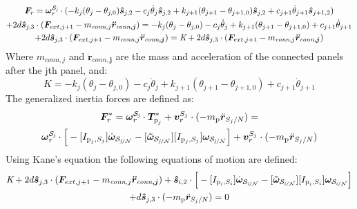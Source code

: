 \documentclass[paper]{aiaaNew}
\begin{document}
\begin{multline}
\bm F_{r} = \bm \omega_{\textit{r}}^{\cal{S}_\textit{j}} \cdot (-k_j (\theta_j-\theta_{j,0}) \bm{\hat{s}}_{j,2} - c_j \dot{\theta}_j \bm{\hat{s}}_{j,2}  +k_{j+1} (\theta_{j+1}-\theta_{j+1,0}) \bm{\hat{s}}_{j,2} +c_{j+1} \dot{\theta}_{j+1} \bm{\hat{s}}_{j+1,2})\\
+ 2d\bm{\hat{s}}_{j,3}\cdot(\bm F_{ext,j+1} - m_{\textit{conn},j}\bm{\ddot{r}_{\textit{conn},j}}) = 
-k_j (\theta_j-\theta_{j,0}) - c_j \dot{\theta}_j + k_{j+1} (\theta_{j+1}-\theta_{j+1,0}) + c_{j+1} \dot{\theta}_{j+1}\\
+ 2d\bm{\hat{s}}_{j,3}\cdot(\bm F_{ext,j+1} - m_{\textit{conn},j}\bm{\ddot{r}_{\textit{conn},j}}) = \textit{K} + 2d\bm{\hat{s}}_{j,3}\cdot(\bm F_{ext,j+1} - m_{\textit{conn},j}\bm{\ddot{r}_{\textit{conn},j}}) 
\end{multline}
Where $m_{\textit{conn},j}$ and $\bm{\ddot{r}_{\textit{conn},j}}$ are the mass and acceleration of the connected panels after the jth panel, and:
\begin{equation}
K= -k_j (\theta_j-\theta_{j,0}) - c_j \dot{\theta}_j + k_{j+1} (\theta_{j+1}-\theta_{j+1,0}) + c_{j+1} \dot{\theta}_{j+1}
\end{equation}
The generalized inertia forces are defined as:
\begin{multline}
\bm F^*_{r} = \bm \omega_{\textit{r}}^{\cal{S}_\textit{j}} \cdot \bm T^*_{\text{p}_j}  +\bm v^{S_j}_{r} \cdot (-m_{\text{p}} \ddot{\bm r}_{S_{j}/N}) = \\ %
\bm \omega_{\textit{r}}^{\cal{S}_\textit{j}} \cdot \Big[-[I_{\text{p}_j,S_j}] \dot{\bm\omega}_{\cal S_{\textit{j}/N}}  -[\bm{\tilde{\omega}}_{\cal S_{\textit{j}/N}}] [I_{\text{p}_j,S_j}] \bm\omega_{\cal S_{\textit{j}/N}} \Big] + \bm v^{S_j}_{r} \cdot (-m_{\text{p}} \ddot{\bm r}_{S_{j}/N}) %
\end{multline}
Using Kane's equation the following equations of motion are defined:
\begin{multline}
\textit{K} + 2d\bm{\hat{s}}_{j,3}\cdot(\bm F_{ext,j+1} - m_{\textit{conn},j}\bm{\ddot{r}_{\textit{conn},j}}) + \bm{\hat{s}}_{i,2} \cdot \Big[-[I_{\text{p}_i,S_i}] \dot{\bm\omega}_{\cal S_{\textit{i}/N}}  -[\bm{\tilde{\omega}}_{\cal S_{\textit{i}/N}}] [I_{\text{p}_i,S_i}] \bm\omega_{\cal S_{\textit{i}/N}} \Big]\\
+ d\bm{\hat{s}}_{j,3} \cdot (-m_{\text{p}} \ddot{\bm r}_{S_{j}/N}) = 0 %
\label{eq:afterkane}
\end{multline}
\end{document}
